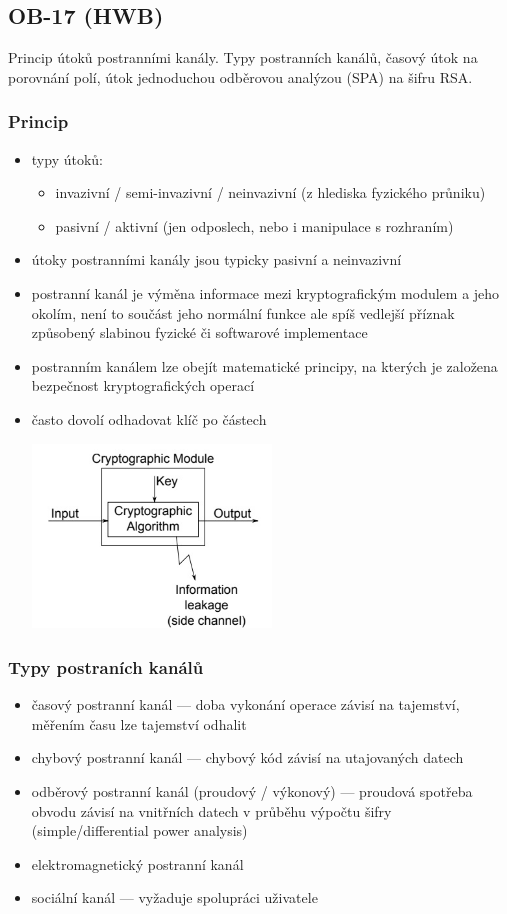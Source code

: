 \subsection{OB-17 (HWB)}
Princip útoků postranními kanály. Typy postranních kanálů, časový útok na porovnání polí, útok jednoduchou odběrovou analýzou (SPA) na šifru RSA.

\subsubsection*{Princip}
\begin{itemize}
	\item typy útoků:
	\begin{itemize}
		\item invazivní / semi-invazivní / neinvazivní (z hlediska fyzického průniku)
		\item pasivní / aktivní (jen odposlech, nebo i manipulace s rozhraním)
	\end{itemize}
	\item útoky postranními kanály jsou typicky pasivní a neinvazivní
	\item postranní kanál je výměna informace mezi kryptografickým modulem a jeho okolím, není to součást jeho normální funkce ale spíš vedlejší příznak způsobený slabinou fyzické či softwarové implementace
	\item postranním kanálem lze obejít matematické principy, na kterých je založena bezpečnost kryptografických operací
	\item často dovolí odhadovat klíč po částech
	
	\includegraphics[width=0.5\textwidth]{img/OB-17_0.jpg}
\end{itemize}

\subsubsection*{Typy postraních kanálů}
\begin{itemize}
	\item časový postranní kanál --- doba vykonání operace závisí na tajemství, měřením času lze tajemství odhalit
	\item chybový postranní kanál --- chybový kód závisí na utajovaných datech
	\item odběrový postranní kanál (proudový / výkonový) ---  proudová spotřeba obvodu závisí na vnitřních datech v průběhu výpočtu šifry (simple/differential power analysis)
	\item elektromagnetický postranní kanál
	\item sociální kanál --- vyžaduje spolupráci uživatele
\end{itemize}

